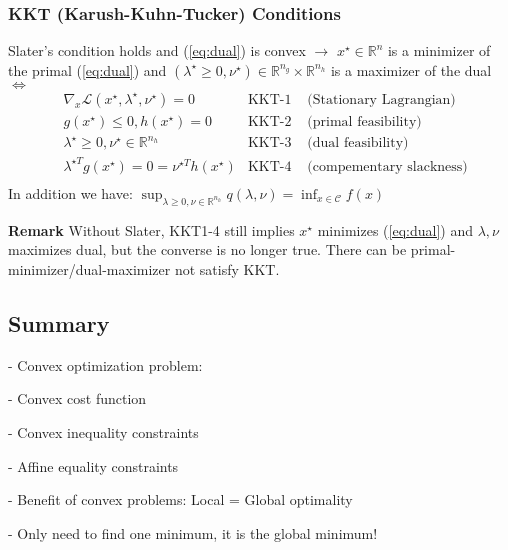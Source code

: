\subsubsection{KKT (Karush-Kuhn-Tucker) Conditions}

\begin{theorem}
	Slater's condition holds
	and (\ref{eq:dual}) is convex
	$\rightarrow$
	$x^\star \in \mathbb{R}^{n}$ is a minimizer of the primal (\ref{eq:dual})
	and $(\lambda^\star \ge 0,\nu^\star) \in \mathbb{R}^{n_g}\times\mathbb{R}^{n_h}$ is a maximizer of the dual
	$\Leftrightarrow$
	$$\begin{aligned}
			 & \nabla_x\mathcal{L}(x^\star,\lambda^\star,\nu^\star)=0
			 & \text{KKT-1 }
			 & \text{(Stationary Lagrangian)}
			\\
			 & g(x^\star)\le0, h(x^\star)=0
			 & \text{KKT-2 }
			 & \text{(primal feasibility)}
			\\
			 & \lambda^\star\ge0, \nu^\star \in \mathbb{R}^{n_h}
			 & \text{KKT-3 }
			 & \text{(dual feasibility)}
			\\
			 & \lambda^{\star T} g(x^\star)=0=\nu^{\star T} h(x^\star)
			 & \text{KKT-4 }
			 & \text{(compementary slackness)}
			\\
		\end{aligned}$$
	In addition we have:
	$\sup_{\lambda\ge0,\nu\in\mathbb{R}^{n_h}}q(\lambda,\nu)=\inf_{x\in\mathcal{C}}f(x)$
\end{theorem}

\textbf{Remark} Without Slater,
KKT1-4 still implies $x^\star$ minimizes (\ref{eq:dual})
and $\lambda,\nu$ maximizes dual,
but the converse is no longer true.
There can be primal-minimizer/dual-maximizer not satisfy KKT.



\subsection{Summary}

- Convex optimization problem:

- Convex cost function

- Convex inequality constraints

- Affine equality constraints

- Benefit of convex problems: Local = Global optimality

- Only need to find one minimum, it is the global minimum!

